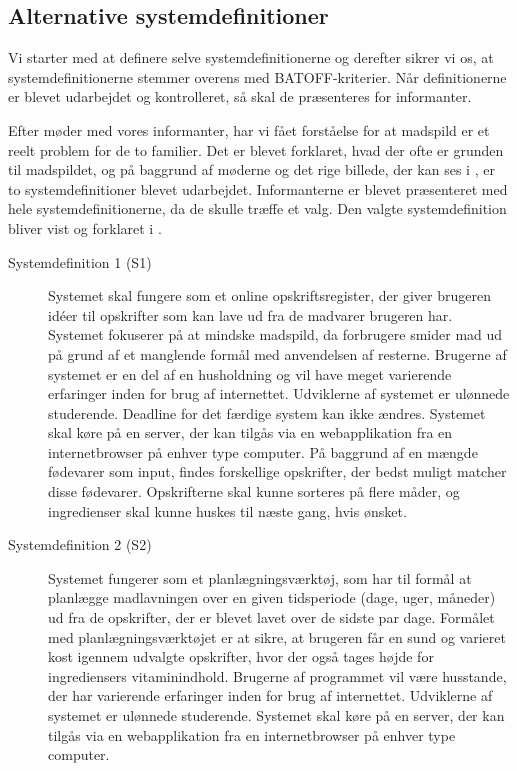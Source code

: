 \subsection{Alternative systemdefinitioner}
\label{subsec:alternativesystemdefinitioner}

Vi starter med at definere selve systemdefinitionerne og derefter sikrer vi os, at systemdefinitionerne stemmer overens med BATOFF-kriterier. Når definitionerne er blevet udarbejdet og kontrolleret, så skal de præsenteres for informanter. 

Efter møder med vores informanter, har vi fået forståelse for at madspild er et reelt problem for de to familier. Det er blevet forklaret, hvad der ofte er grunden til madspildet, og på baggrund af møderne og det rige billede, der kan ses i , er to systemdefinitioner blevet udarbejdet. Informanterne er blevet præsenteret med hele systemdefinitionerne, da de skulle træffe et valg. Den valgte systemdefinition bliver vist og forklaret i .

\begin{description}
\item[Systemdefinition 1 (S1)] 
Systemet skal fungere som et online opskriftsregister, der giver brugeren idéer til opskrifter som kan lave ud fra de madvarer brugeren har. Systemet fokuserer på at mindske madspild, da forbrugere smider mad ud på grund af et manglende formål med anvendelsen af resterne. Brugerne af systemet er en del af en husholdning og vil have meget varierende erfaringer inden for brug af internettet. Udviklerne af systemet er ulønnede studerende. Deadline for det færdige system kan ikke ændres. Systemet skal køre på en server, der kan tilgås via en webapplikation fra en internetbrowser på enhver type computer. På baggrund af en mængde fødevarer som input, findes forskellige opskrifter, der bedst muligt matcher disse fødevarer. Opskrifterne skal kunne sorteres på flere måder, og ingredienser skal kunne huskes til næste gang, hvis ønsket.
\item[Systemdefinition 2 (S2)] 
Systemet fungerer som et planlægningsværktøj, som har til formål at planlægge madlavningen over en given tidsperiode (\fx dage, uger, måneder) ud fra de opskrifter, der er blevet lavet over de sidste par dage. Formålet med planlægningsværktøjet er at sikre, at brugeren får en sund og varieret kost igennem udvalgte opskrifter, hvor der også tages højde for ingrediensers vitaminindhold. Brugerne af programmet vil være husstande, der har varierende erfaringer inden for brug af internettet. Udviklerne af systemet er ulønnede studerende. Systemet skal køre på en server, der kan tilgås via en webapplikation fra en internetbrowser på enhver type computer.
\end{description}


